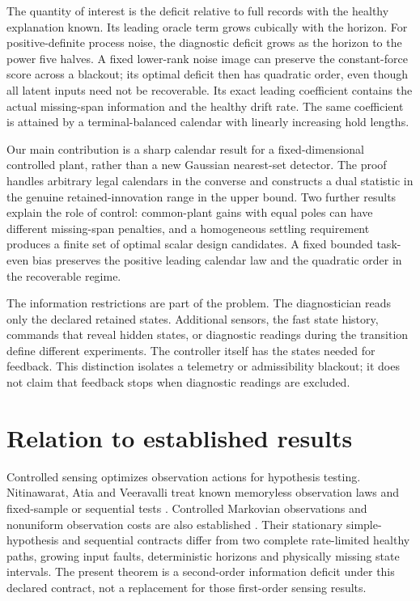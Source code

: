 \documentclass[11pt]{article}
\begin{document}
The quantity of interest is the deficit relative to full records with the healthy
explanation known. Its leading oracle term grows cubically with the horizon.
For positive-definite process noise, the diagnostic deficit grows as the
horizon to the power five halves. A fixed lower-rank noise image can preserve
the constant-force score across a blackout; its optimal deficit then has
quadratic order, even though all latent inputs need not be recoverable. Its exact leading
coefficient contains the actual missing-span information and the healthy drift
rate. The same coefficient is attained by a terminal-balanced calendar with
linearly increasing hold lengths.

Our main contribution is a sharp calendar result for a fixed-dimensional
controlled plant, rather than a new Gaussian nearest-set detector.
The proof handles arbitrary legal calendars in the converse and constructs a
dual statistic in the genuine retained-innovation range in the upper bound.
Two further results explain the role of control: common-plant gains with equal
poles can have different missing-span penalties, and a homogeneous settling
requirement produces a finite set of optimal scalar design candidates.
A fixed bounded task-even bias preserves the positive leading calendar law
and the quadratic order in the recoverable regime.

The information restrictions are part of the problem. The diagnostician reads
only the declared retained states. Additional sensors, the fast state history,
commands that reveal hidden states, or diagnostic readings during the transition
define different experiments. The controller itself has the states needed for
feedback. This distinction isolates a telemetry or admissibility blackout; it
does not claim that feedback stops when diagnostic readings are excluded.

\section{Relation to established results}
Controlled sensing optimizes observation actions for hypothesis testing.
Nitinawarat, Atia and Veeravalli treat known memoryless observation laws and
fixed-sample or sequential tests \cite{controlled}.
Controlled Markovian observations and nonuniform observation costs are also
established \cite{markov}. Their stationary simple-hypothesis and sequential
contracts differ from two complete rate-limited healthy paths, growing input
faults, deterministic horizons and physically missing state intervals.
The present theorem is a second-order information deficit under this declared
contract, not a replacement for those first-order sensing results.
\end{document}
